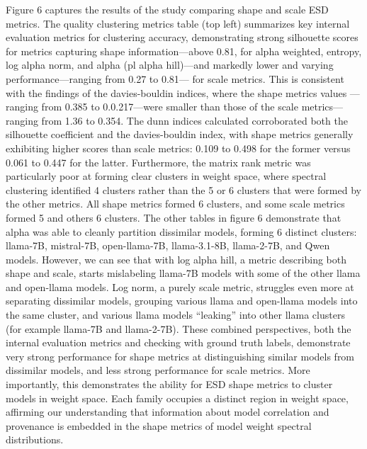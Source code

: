 Figure 6 captures the results of the study comparing shape and scale ESD metrics. The quality clustering metrics table (top left) summarizes key internal evaluation metrics for clustering accuracy, demonstrating strong silhouette scores for metrics capturing shape information—above 0.81, for alpha weighted, entropy, log alpha norm, and alpha (pl alpha hill)—and markedly lower and varying performance—ranging from 0.27 to 0.81— for scale metrics. This is consistent with the findings of the davies-bouldin indices, where the shape metrics values —ranging from 0.385 to 0.0.217—were smaller than those of the scale metrics—ranging from 1.36 to 0.354. The dunn indices calculated corroborated both the silhouette coefficient and the davies-bouldin index, with shape metrics generally exhibiting higher scores than scale metrics: 0.109 to 0.498 for the former versus 0.061 to 0.447 for the latter. Furthermore, the matrix rank metric was particularly poor at forming clear clusters in weight space, where spectral clustering identified 4 clusters rather than the 5 or 6 clusters that were formed by the other metrics. All shape metrics formed 6 clusters, and some scale metrics formed 5 and others 6 clusters. The other tables in figure 6 demonstrate that alpha was able to cleanly partition dissimilar models, forming 6 distinct clusters: llama-7B, mistral-7B, open-llama-7B, llama-3.1-8B, llama-2-7B, and Qwen models. However, we can see that with log alpha hill, a metric describing both shape and scale, starts mislabeling llama-7B models with some of the other llama and open-llama models. Log norm, a purely scale metric, struggles even more at separating dissimilar models, grouping various llama and open-llama models into the same cluster, and various llama models “leaking” into other llama clusters (for example llama-7B and llama-2-7B). These combined perspectives, both the internal evaluation metrics and checking with ground truth labels, demonstrate very strong performance for shape metrics at distinguishing similar models from dissimilar models, and less strong performance for scale metrics. More importantly, this demonstrates the ability for ESD shape metrics to cluster models in weight space. Each family occupies a distinct region in weight space, affirming our understanding that information about model correlation and provenance is embedded in the shape metrics of model weight spectral distributions.  

